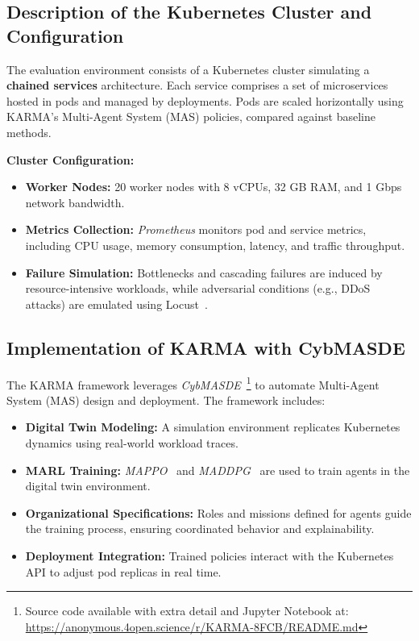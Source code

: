 \documentclass[conference]{IEEEtran}
\begin{document}
\subsection{Description of the Kubernetes Cluster and Configuration}

The evaluation environment consists of a Kubernetes cluster simulating a \textbf{chained services} architecture. Each service comprises a set of microservices hosted in pods and managed by deployments. Pods are scaled horizontally using KARMA's Multi-Agent System (MAS) policies, compared against baseline methods.

\textbf{Cluster Configuration:}
\begin{itemize}
    \item \textbf{Worker Nodes:} 20 worker nodes with 8 vCPUs, 32 GB RAM, and 1 Gbps network bandwidth.
    \item \textbf{Metrics Collection:} \textit{Prometheus} monitors pod and service metrics, including CPU usage, memory consumption, latency, and traffic throughput.
    \item \textbf{Failure Simulation:} Bottlenecks and cascading failures are induced by resource-intensive workloads, while adversarial conditions (e.g., DDoS attacks) are emulated using Locust~\cite{locust2021}.
\end{itemize}

\subsection{Implementation of KARMA with CybMASDE}

The KARMA framework leverages \textit{CybMASDE}~\footnote{Source code available with extra detail and Jupyter Notebook at: \url{https://anonymous.4open.science/r/KARMA-8FCB/README.md}} to automate Multi-Agent System (MAS) design and deployment. The framework includes:
\begin{itemize}
    \item \textbf{Digital Twin Modeling:} A simulation environment replicates Kubernetes dynamics using real-world workload traces.
    \item \textbf{MARL Training:} \textit{MAPPO}~\cite{yu2021mappo} and \textit{MADDPG}~\cite{lowe2017multi} are used to train agents in the digital twin environment.
    \item \textbf{Organizational Specifications:} Roles and missions defined for agents guide the training process, ensuring coordinated behavior and explainability.
    \item \textbf{Deployment Integration:} Trained policies interact with the Kubernetes API to adjust pod replicas in real time.
\end{itemize}
\end{document}
